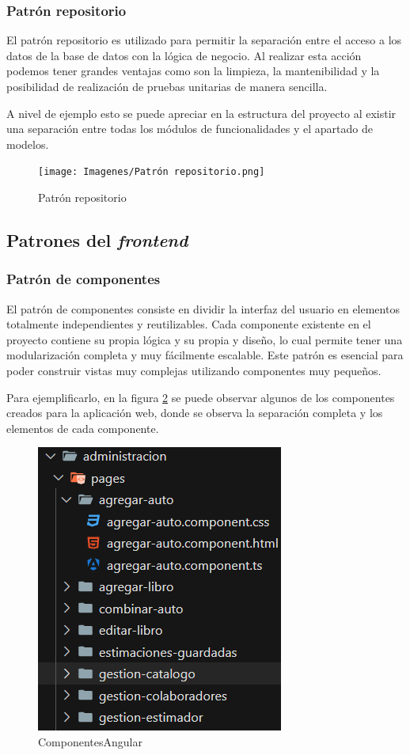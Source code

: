 \subsubsection{Patrón repositorio\cite{PatrónRepositorio}}
El patrón repositorio es utilizado para permitir la separación entre el acceso a los datos de la base de datos con la lógica de negocio. Al realizar esta acción podemos tener grandes ventajas como son la limpieza, la mantenibilidad y la posibilidad de realización de pruebas unitarias de manera sencilla.

A nivel de ejemplo esto se puede apreciar en la estructura del proyecto al existir una separación entre todas los módulos de funcionalidades y el apartado de modelos.

\begin{figure}[htbp]
    \centering
    \texttt{[image: Imagenes/Patrón repositorio.png]}
    \caption{Patrón repositorio}
    \label{Patrón repositorio}
\end{figure}
\FloatBarrier

\subsection{Patrones del \textit{frontend}}
\subsubsection{Patrón de componentes~\cite{PatrónComponentes}}
El patrón de componentes consiste en dividir la interfaz del usuario en elementos totalmente independientes y reutilizables. Cada componente existente en el proyecto contiene su propia lógica y su propia y diseño, lo cual permite tener una modularización completa y muy fácilmente escalable. Este patrón es esencial para poder construir vistas muy complejas utilizando componentes muy pequeños.

Para ejemplificarlo, en la figura \ref{ComponentesAngular} se puede observar algunos de los componentes creados para la aplicación web, donde se observa la separación completa y los elementos de cada componente.
\begin{figure}
    \centering
    \includegraphics[width=0.4\linewidth]{Imagenes/ComponentesAngular.png}
    \caption{ComponentesAngular}
    \label{ComponentesAngular}
\end{figure}
\FloatBarrier

